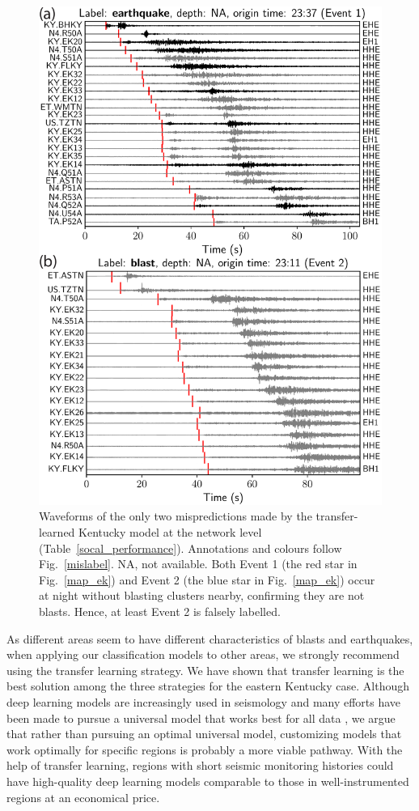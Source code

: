 \documentclass{gji}
\begin{document}
\begin{figure}
\centering
\includegraphics[width=.85\textwidth]{mislabelling_ek.pdf}
\caption{Waveforms of the only two mispredictions made by the transfer-learned Kentucky model at the network level (Table~\ref{socal_performance}). Annotations and colours follow Fig.~\ref{mislabel}. NA, not available. Both Event 1 (the red star in Fig.~\ref{map_ek}) and Event 2 (the blue star in Fig.~\ref{map_ek}) occur at night without blasting clusters nearby, confirming they are not blasts. Hence, at least Event 2 is falsely labelled.}
\label{mislabel_ek}
\end{figure}

As different areas seem to have different characteristics of blasts and earthquakes, when applying our classification models to other areas, we strongly recommend using the transfer learning strategy. We have shown that transfer learning is the best solution among the three strategies for the eastern Kentucky case. Although deep learning models are increasingly used in seismology and many efforts have been made to pursue a universal model that works best for all data \citep{gpd,phasenet,mousavi}, we argue that rather than pursuing an optimal universal model, customizing models that work optimally for specific regions is probably a more viable pathway. With the help of transfer learning, regions with short seismic monitoring histories could have high-quality deep learning models comparable to those in well-instrumented regions at an economical price. 
\end{document}
